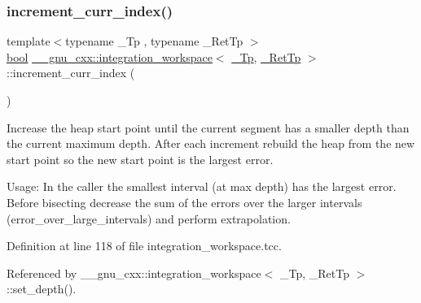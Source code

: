 \subsubsection{\texorpdfstring{increment\+\_\+curr\+\_\+index()}{increment\_curr\_index()}}
{\footnotesize\ttfamily template$<$typename \+\_\+\+Tp , typename \+\_\+\+Ret\+Tp $>$ \\
\hyperlink{namespace____gnu__cxx_ae83aca57f97767d5d09188718728a0ac}{bool} \hyperlink{class____gnu__cxx_1_1integration__workspace}{\+\_\+\+\_\+gnu\+\_\+cxx\+::integration\+\_\+workspace}$<$ \hyperlink{namespace____gnu__cxx_a3b19a9c800ca194374ef9172290f7d79}{\+\_\+\+Tp}, \hyperlink{namespace____gnu__cxx_a886e03ece3d53ff7fa6c098a40f93fa5}{\+\_\+\+Ret\+Tp} $>$\+::increment\+\_\+curr\+\_\+index (\begin{DoxyParamCaption}{ }\end{DoxyParamCaption})}

Increase the heap start point until the current segment has a smaller depth than the current maximum depth. After each increment rebuild the heap from the new start point so the new start point is the largest error.

Usage\+: In the caller the smallest interval (at max depth) has the largest error. Before bisecting decrease the sum of the errors over the larger intervals (error\+\_\+over\+\_\+large\+\_\+intervals) and perform extrapolation. 

Definition at line 118 of file integration\+\_\+workspace.\+tcc.



Referenced by \+\_\+\+\_\+gnu\+\_\+cxx\+::integration\+\_\+workspace$<$ \+\_\+\+Tp, \+\_\+\+Ret\+Tp $>$\+::set\+\_\+depth().


